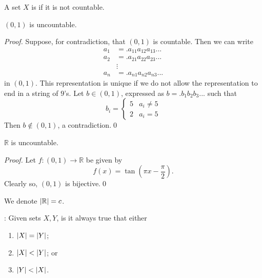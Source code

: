 \documentclass[notoc,notitlepage]{tufte-book}
\begin{document}
\begin{defn}[Uncountable]
\label{defn:uncountable}
  A set $X$ is  if it is not countable.
\end{defn}

\begin{thm}
\label{thm:cantor_s_diagonal_argument}
  $(0, 1)$ is uncountable.
\end{thm}

\begin{proof}
  Suppose, for contradiction, that $(0, 1)$ is countable. Then we can write
  \begin{align*}
    a_1 &= .a_{11} a_{12} a_{13} ... \\
    a_2 &= .a_{21} a_{22} a_{23} ... \\
        &\vdots \\
    a_n &= .a_{n1} a_{n2} a_{n3} ...
  \end{align*}
  in $(0, 1)$. This representation is unique if we do not allow the representation to end in a string of $9$'s. Let $b \in (0, 1)$, expressed as $b = . b_1 b_2 b_3 ...$ such that
  \begin{equation*}
    b_i = \begin{cases}
      5 & a_i \neq 5 \\
      2 & a_i = 5
    \end{cases}
  \end{equation*}
  Then $b \notin (0, 1)$, a contradiction.\qed
\end{proof}

\begin{crly}
\label{crly:uncountability_of_r}
  $\mathbb{R}$ is uncountable.
\end{crly}

\begin{proof}
  Let $f : (0, 1) \to \mathbb{R}$ be given by
  \begin{equation*}
    f(x) = \tan \left( \pi x - \frac{\pi}{2} \right).
  \end{equation*}
  Clearly so, $(0, 1)$ is bijective.\qed
\end{proof}

\begin{note}
  We denote $\left|\mathbb{R}\right| = c$.
\end{note}

: Given sets $X, Y$, is it always true that either
\begin{enumerate}
  \item $\left|X\right| = \left|Y\right|$;
  \item $\left|X\right| < \left|Y\right|$; or
  \item $\left|Y\right| < \left|X\right|$.
\end{enumerate}
\end{document}
